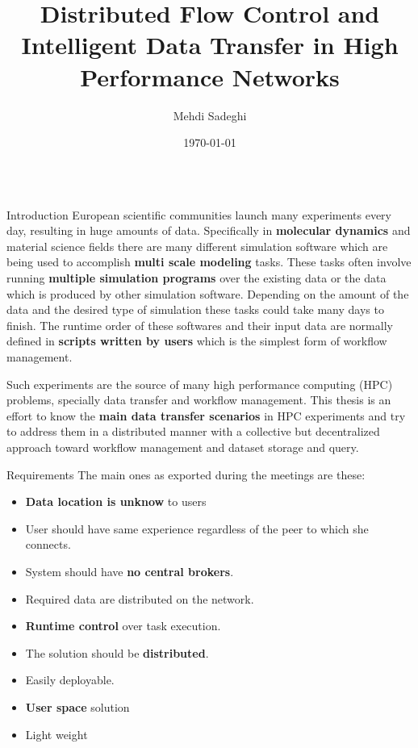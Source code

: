 \documentclass[final,hyperref={pdfpagelabels=true}]{beamer}
\title[Communication and Media Engineering]{Distributed Flow Control and Intelligent Data Transfer in High Performance Networks}
\author[msadeghi@stud.hs-offenburg.de]{Mehdi Sadeghi}
\institute[]{%
  Hochschule für Technik, Wirtschaft und Medien Offenburg\\[0.25\baselineskip]
  Fakultät Medien und Informationswesen\\[0.25\baselineskip]
  Professorin: Dr. Katharina Mehner-Heindl\\[0.25\baselineskip]
  Betreuer: Dr. Adham Hashibon
}
\date[\today]{\today}
\begin{document}
\begin{frame}
  \begin{columns}[t]
    \begin{column}{.45\textwidth}
      \begin{block}{Introduction}
European scientific communities launch many experiments every day, resulting in huge amounts
of data. Specifically in \textbf{molecular dynamics} and material science fields there are many different
simulation software which are being used to accomplish \textbf{multi scale modeling} tasks. These tasks
often involve running \textbf{multiple simulation programs} over the existing data or the data which is
produced by other simulation software. Depending on the amount of the data and the desired type of simulation
these tasks could take many days to finish. The runtime order of these softwares and 
their input data are normally defined in \textbf{scripts written by users} which is the simplest
form of workflow management.

Such experiments are the source of many high performance computing (HPC) problems, specially data transfer
and workflow management. This thesis is an effort to know the \textbf{main data transfer scenarios} in HPC experiments 
and try to address them in a distributed manner with a collective but decentralized approach toward workflow management
and dataset storage and query.

      \end{block}
      
      \begin{block}{Requirements}
      The main ones as exported during the meetings are these:
        \begin{itemize}
        \item \textbf{Data location is unknow} to users
        \item User should have same experience regardless of the peer to which she connects.
        \item System should have \textbf{no central brokers}.
        \item Required data are distributed on the network.
        \item \textbf{Runtime control} over task execution.
        \item The solution should be \textbf{distributed}.
        \item Easily deployable.
        \item \textbf{User space} solution
        \item Light weight
        \end{itemize}
      \end{block}


\end{column}
\end{columns}
\end{frame}
\end{document}
